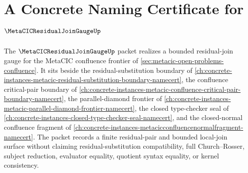 \chapter{A Concrete Naming Certificate for $\MetaCICResidualJoinGaugeUp$}
\label{ch:concrete-instances-metacic-residual-join-gauge-namecert}

The $\MetaCICResidualJoinGaugeUp$ packet realizes a bounded residual-join gauge for the MetaCIC confluence frontier of \autoref{sec:metacic-open-problems-confluence}. It sits beside the residual-substitution boundary of \autoref{ch:concrete-instances-metacic-residual-substitution-boundary-namecert}, the confluence critical-pair boundary of \autoref{ch:concrete-instances-metacic-confluence-critical-pair-boundary-namecert}, the parallel-diamond frontier of \autoref{ch:concrete-instances-metacic-parallel-diamond-frontier-namecert}, the closed type-checker seal of \autoref{ch:concrete-instances-closed-type-checker-seal-namecert}, and the closed-normal confluence fragment of \autoref{ch:concrete-instances-metacicconfluencenormalfragment-namecert}. The packet records a finite residual-pair and bounded local-join surface without claiming residual-substitution compatibility, full Church--Rosser, subject reduction, evaluator equality, quotient syntax equality, or kernel consistency.

